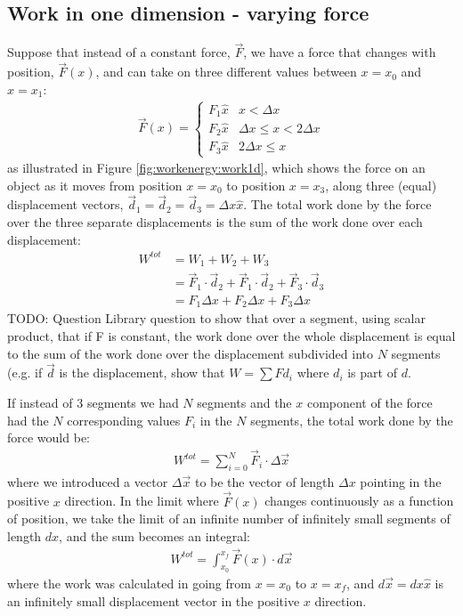 \subsection{Work in one dimension - varying force}
Suppose that instead of a constant force, $\vec F$, we have a force that changes with position, $\vec F(x)$, and can take on three different values between $x=x_0$ and $x=x_1$:
\begin{align*}
  \vec F (x)=
  \begin{cases}
    F_1\hat x & x<\Delta x \\
    F_2\hat x & \Delta x \leq x< 2\Delta x \\
    F_3\hat x & 2\Delta x \leq x
  \end{cases}
\end{align*}
as illustrated in Figure \ref{fig:workenergy:work1d}, which shows the force on an object as it moves from position $x=x_0$ to position $x=x_3$, along three (equal) displacement vectors, $\vec d_1=\vec d_2=\vec d_3=\Delta x \hat x$. 
The total work done by the force over the three separate displacements is the sum of the work done over each displacement:
\begin{align*}
W^{tot}&=W_1+W_2+W_3\\
&=\vec F_1\cdot \vec d_2+\vec F_1\cdot \vec d_2+\vec F_3\cdot \vec d_3\\
&= F_1\Delta x +F_2\Delta x + F_3\Delta x
\end{align*}
TODO: Question Library question to show that over a segment, using scalar product, that if F is constant, the work done over the whole displacement is equal to the sum of the work done over the displacement subdivided into $N$ segments (e.g. if $\vec d$ is the displacement, show that $W = \sum F d_i$ where $d_i$ is part of $d$.  


If instead of 3 segments we had $N$ segments and the $x$ component of the force had the $N$ corresponding values $F_i$ in the $N$ segments, the total work done by the force would be:
\begin{align*}
W^{tot} = \sum_{i=0}^N\vec F_i \cdot \Delta \vec x
\end{align*}
where we introduced a vector $\Delta \vec x$ to be the vector of length $\Delta x$ pointing in the positive $x$ direction. In the limit where $\vec F(x)$ changes continuously as a function of position, we take the limit of an infinite number of infinitely small segments of length $dx$, and the sum becomes an integral:
\begin{align*}
W^{tot} = \int_{x_0}^{x_f}\vec F(x) \cdot d\vec x
\end{align*}
where the work was calculated in going from $x=x_0$ to $x=x_f$, and $d\vec x=dx\hat x$ is an infinitely small displacement vector in the positive $x$ direction.

